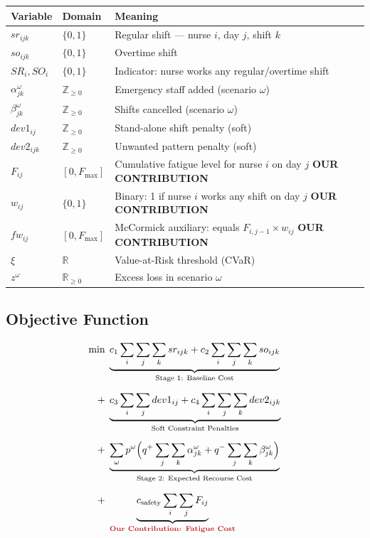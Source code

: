 \documentclass[12pt,a4paper]{article}
\newcommand{\contribbadge}{\colorbox{accentred}{\tiny\color{white}\textbf{OUR CONTRIBUTION}}\,}
\begin{document}
\begin{center}
\begin{tabularx}{\textwidth}{@{}llX@{}}
  \toprule
  \textbf{Variable} & \textbf{Domain} & \textbf{Meaning}\\
  \midrule
  $sr_{ijk}$         & $\{0,1\}$          & Regular shift — nurse $i$, day $j$, shift $k$\\
  $so_{ijk}$         & $\{0,1\}$          & Overtime shift\\
  $SR_i, SO_i$       & $\{0,1\}$          & Indicator: nurse works any regular/overtime shift\\
  $\alpha_{jk}^{\omega}$ & $\mathbb{Z}_{\geq 0}$ & Emergency staff added (scenario $\omega$)\\
  $\beta_{jk}^{\omega}$  & $\mathbb{Z}_{\geq 0}$ & Shifts cancelled (scenario $\omega$)\\
  $dev1_{ij}$        & $\mathbb{Z}_{\geq 0}$ & Stand-alone shift penalty (soft)\\
  $dev2_{ijk}$       & $\mathbb{Z}_{\geq 0}$ & Unwanted pattern penalty (soft)\\
  \rowcolor{palegreen}
  $F_{ij}$           & $[0,F_{\max}]$     & Cumulative fatigue level for nurse $i$ on day $j$ \contribbadge\\
  \rowcolor{palegreen}
  $w_{ij}$           & $\{0,1\}$          & Binary: 1 if nurse $i$ works any shift on day $j$ \contribbadge\\
  \rowcolor{palegreen}
  $fw_{ij}$          & $[0,F_{\max}]$     & McCormick auxiliary: equals $F_{i,j-1}\times w_{ij}$ \contribbadge\\
  $\xi$              & $\mathbb{R}$       & Value-at-Risk threshold (CVaR)\\
  $z^{\omega}$       & $\mathbb{R}_{\geq 0}$ & Excess loss in scenario $\omega$\\
  \bottomrule
\end{tabularx}
\end{center}

\subsection{Objective Function}

\begin{eqbox}
\begin{align}
  \min\;
  &\underbrace{c_1 \sum_i\sum_j\sum_k sr_{ijk}
  + c_2 \sum_i\sum_j\sum_k so_{ijk}}_{\text{Stage 1: Baseline Cost}}
  \notag\\[6pt]
  +\;&\underbrace{c_3 \sum_i\sum_j dev1_{ij}
  + c_4 \sum_i\sum_j\sum_k dev2_{ijk}}_{\text{Soft Constraint Penalties}}
  \notag\\[6pt]
  +\;&\underbrace{\sum_{\omega} p^{\omega}
    \Bigl(q^{+}\sum_j\sum_k\alpha_{jk}^{\omega}
         +q^{-}\sum_j\sum_k\beta_{jk}^{\omega}\Bigr)
  }_{\text{Stage 2: Expected Recourse Cost}}
  \notag\\[6pt]
  +\;&\underbrace{c_{\text{safety}}\sum_i\sum_j F_{ij}
  }_{\textcolor{accentred}{\textbf{Our Contribution: Fatigue Cost}}}
\end{align}
\end{eqbox}
\end{document}
